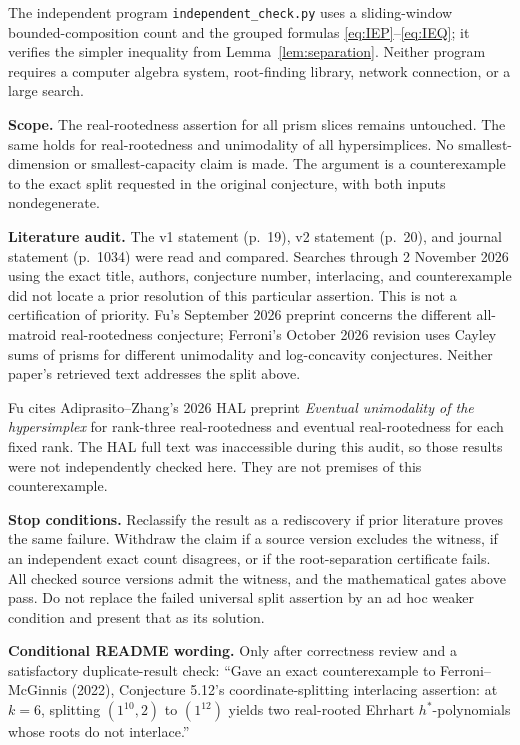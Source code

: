 \documentclass[11pt]{article}
\begin{document}
The independent program \texttt{independent\_check.py} uses a sliding-window bounded-composition count and the grouped formulas \eqref{eq:IEP}--\eqref{eq:IEQ}; it verifies the simpler inequality from Lemma~\ref{lem:separation}. Neither program requires a computer algebra system, root-finding library, network connection, or a large search.

\textbf{Scope.} The real-rootedness assertion for all prism slices remains untouched. The same holds for real-rootedness and unimodality of all hypersimplices. No smallest-dimension or smallest-capacity claim is made. The argument is a counterexample to the exact split requested in the original conjecture, with both inputs nondegenerate.

\textbf{Literature audit.} The v1 statement (p.~19), v2 statement (p.~20), and journal statement (p.~1034) were read and compared. Searches through 2 November 2026 using the exact title, authors, conjecture number, interlacing, and counterexample did not locate a prior resolution of this particular assertion. This is not a certification of priority. Fu's September 2026 preprint \cite{Fu} concerns the different all-matroid real-rootedness conjecture; Ferroni's October 2026 revision \cite{FSh} uses Cayley sums of prisms for different unimodality and log-concavity conjectures. Neither paper's retrieved text addresses the split above.

Fu cites Adiprasito--Zhang's 2026 HAL preprint \emph{Eventual unimodality of the hypersimplex} for rank-three real-rootedness and eventual real-rootedness for each fixed rank. The HAL full text was inaccessible during this audit, so those results were not independently checked here. They are not premises of this counterexample.

\textbf{Stop conditions.} Reclassify the result as a rediscovery if prior literature proves the same failure. Withdraw the claim if a source version excludes the witness, if an independent exact count disagrees, or if the root-separation certificate fails. All checked source versions admit the witness, and the mathematical gates above pass. Do not replace the failed universal split assertion by an ad hoc weaker condition and present that as its solution.

\newpage
\begin{samepage}
\textbf{Conditional README wording.} Only after correctness review and a satisfactory duplicate-result check: ``Gave an exact counterexample to Ferroni--McGinnis (2022), Conjecture 5.12's coordinate-splitting interlacing assertion: at $k=6$, splitting $(1^{10},2)$ to $(1^{12})$ yields two real-rooted Ehrhart $h^*$-polynomials whose roots do not interlace.''
\end{samepage}
\end{document}
